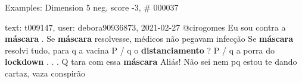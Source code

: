 \begin{frame}{Examples: Dimension 5 neg, score -3, \# 000037}
\footnotesize
\begin{alertblock}{text: t009147, user: debora90936873, 2021-02-27}
@cirogomes Eu sou contra a \textbf{máscara} . Se \textbf{máscara} resolvesse, 
médicos não pegavam infecção Se \textbf{máscara} resolvi tudo, para q a vacina 
P / q o \textbf{distanciamento} ? P / q a porra do \textbf{lockdown} . . . Q 
tara com essa \textbf{máscara}  Aliás! Não sei 
nem pq estou te dando cartaz, vaza conspirão 
\end{alertblock}
\end{frame}
